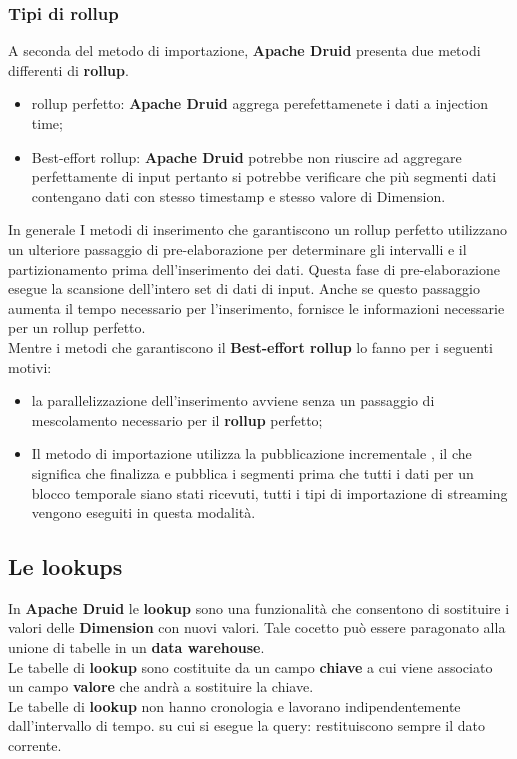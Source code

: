 \documentclass{article}
\begin{document}
\subsubsection{Tipi di rollup}
A seconda del metodo di importazione, \textbf{Apache Druid} presenta due metodi differenti di \textbf{rollup}.
\begin{itemize}
    \item rollup perfetto: \textbf{Apache Druid} aggrega perefettamenete i dati a injection time;
    \item Best-effort rollup: \textbf{Apache Druid} potrebbe non riuscire ad aggregare perfettamente di input pertanto si potrebbe verificare che più segmenti dati contengano dati con stesso timestamp e stesso valore di Dimension.
\end{itemize}
In generale I metodi di inserimento che garantiscono un rollup perfetto utilizzano un ulteriore passaggio di pre-elaborazione per determinare gli intervalli e il partizionamento prima dell'inserimento dei dati. Questa fase di pre-elaborazione esegue la scansione dell'intero set di dati di input. Anche se questo passaggio aumenta il tempo necessario per l'inserimento, fornisce le informazioni necessarie per un rollup perfetto.\\
Mentre i metodi che garantiscono il \textbf{Best-effort rollup} lo fanno per i seguenti motivi: 
\begin{itemize}
    \item la parallelizzazione dell'inserimento avviene senza un passaggio di mescolamento necessario per il \textbf{rollup} perfetto;
    \item Il metodo di importazione utilizza la pubblicazione incrementale , il che significa che finalizza e pubblica i segmenti prima che tutti i dati per un blocco temporale siano stati ricevuti, tutti i tipi di importazione di streaming vengono eseguiti in questa modalità.
\end{itemize}
\subsection{Le lookups}
In \textbf{Apache Druid} le \textbf{lookup} sono una funzionalità che consentono di sostituire i valori delle \textbf{Dimension} con nuovi valori. Tale cocetto può essere paragonato alla unione di tabelle in un \textbf{data warehouse}.\\
Le tabelle di \textbf{lookup} sono costituite da un campo \textbf{chiave} a cui viene associato un campo \textbf{valore} che andrà a sostituire la chiave.\\
Le tabelle di \textbf{lookup} non hanno cronologia e lavorano indipendentemente dall'intervallo di tempo. su cui si esegue la query: restituiscono sempre il dato corrente.
\end{document}
